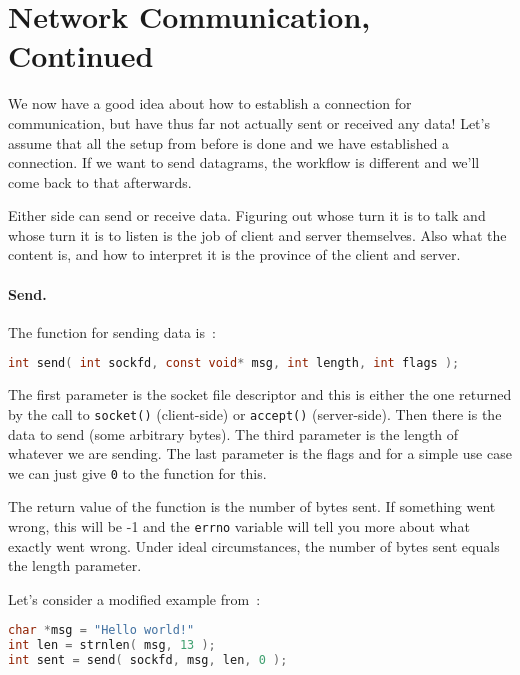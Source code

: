 




\section*{Network Communication, Continued}

We now have a good idea about how to establish a connection for communication, but have thus far not actually sent or received any data! Let's assume that all the setup from before is done and we have established a connection. If we want to send datagrams, the workflow is different and we'll come back to that afterwards.

Either side can send or receive data. Figuring out whose turn it is to talk and whose turn it is to listen is the job of client and server themselves. Also what the content is, and how to interpret it is the province of the client and server.

\paragraph{Send.} The function for sending data is~\cite{apunix}:
\begin{lstlisting}[language=C]
int send( int sockfd, const void* msg, int length, int flags );
\end{lstlisting}

The first parameter is the socket file descriptor and this is either the one returned by the call to \texttt{socket()} (client-side) or \texttt{accept()} (server-side). Then there is the data to send (some arbitrary bytes). The third parameter is the length of whatever we are sending. The last parameter is the flags and for a simple use case we can just give \texttt{0} to the function for this.

The return value of the function is the number of bytes sent. If something went wrong, this will be -1 and the \texttt{errno} variable will tell you more about what exactly went wrong. Under ideal circumstances, the number of bytes sent equals the length parameter.

Let's consider a modified example from~\cite{getaddrinfo}:
\begin{lstlisting}[language=C]
char *msg = "Hello world!"
int len = strnlen( msg, 13 );
int sent = send( sockfd, msg, len, 0 );
\end{lstlisting}

